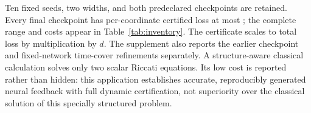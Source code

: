 Ten fixed seeds, two widths, and both predeclared checkpoints are retained. Every final checkpoint has per-coordinate certified loss at most \RInventoryFinalMax; the complete range and costs appear in Table~\ref{tab:inventory}. The certificate scales to total loss by multiplication by $d$. The supplement also reports the earlier checkpoint and fixed-network time-cover refinements separately. A structure-aware classical calculation solves only two scalar Riccati equations. Its low cost is reported rather than hidden: this application establishes accurate, reproducibly generated neural feedback with full dynamic certification, not superiority over the classical solution of this specially structured problem.

